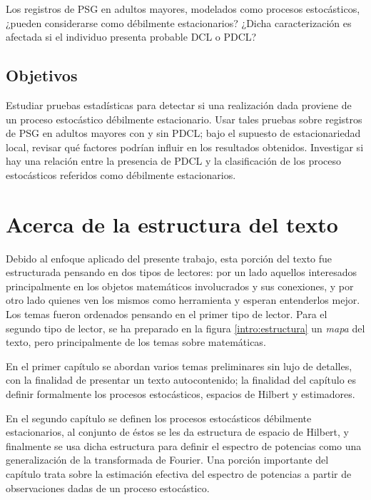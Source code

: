 \documentclass[12pt,letterpaper]{book}
\begin{document}
Los registros de PSG en adultos mayores, modelados como procesos estocásticos, ¿pueden considerarse como débilmente estacionarios?
%
¿Dicha caracterización es afectada si el individuo presenta probable DCL o PDCL?


\subsection*{Objetivos}

Estudiar pruebas estadísticas para detectar si una realización dada proviene de un proceso estocástico débilmente estacionario.
%
Usar tales pruebas sobre registros de PSG en adultos mayores con y sin PDCL; bajo el supuesto de estacionariedad local, revisar qué factores podrían influir en los resultados obtenidos.
%
Investigar si hay una relación entre la presencia de PDCL y la clasificación de los proceso estocásticos referidos como débilmente estacionarios.


\section*{Acerca de la estructura del texto}

Debido al enfoque aplicado del presente trabajo, esta porción del texto fue estructurada pensando en dos tipos de lectores: por un lado aquellos interesados principalmente en los objetos matemáticos involucrados y sus conexiones, y por otro lado quienes ven los mismos como herramienta y esperan entenderlos mejor.
%
Los temas fueron ordenados pensando en el primer tipo de lector.
%
Para el segundo tipo de lector, se ha preparado en la figura \ref{intro:estructura} un \textit{mapa} del texto, pero principalmente de los temas sobre matemáticas.

En el primer capítulo se abordan varios temas preliminares sin lujo de detalles, con la finalidad de presentar un texto autocontenido;
%
la finalidad del capítulo es definir formalmente los procesos estocásticos, espacios de Hilbert y estimadores.

En el segundo capítulo se definen los procesos estocásticos débilmente estacionarios, al conjunto de éstos se les da estructura de espacio de Hilbert, y finalmente se usa dicha estructura para definir el espectro de potencias como una generalización de la transformada de Fourier.
%
Una porción importante del capítulo trata sobre la estimación efectiva del espectro de potencias a partir de observaciones dadas de un proceso estocástico.
\end{document}
